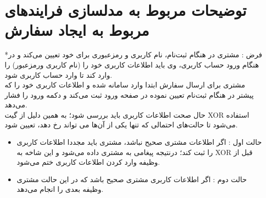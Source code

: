\documentclass[14pt]{article}
\begin{document}
 
\section{ توضيحات مربوط به مدلسازی فرایندهای مربوط به ایجاد سفارش}




*فرض : مشتری در هنگام ثبت‌نام، نام کاربری و رمزعبوری برای خود تعیین می‌کند و در هنگام ورود حساب کاربری، وی باید اطلاعات کاربری خود را (نام کاربری ورمزعبور) را وارد کند تا وارد حساب کاربری شود.\\

مشتری برای ارسال سفارش ابتدا وارد سامانه شده و اطلاعات کاربری خود را که پیشتر در هنگام ثبت‌نام تعیین نموده  در صفحه ورود ثبت می‌کند و دکمه ورود را فشار می‌دهد. \\
حال صحت اطلاعات کاربری باید بررسی شود؛ به همین دلیل از گیت    
XOR  استفاده می‌شود تا حالت‌های احتمالی که تنها یکی از آن‌ها می تواند رخ دهد، تعیین شود.\\
\begin{flushright}
\begin{itemize}
\item حالت اول : اگر اطلاعات مشتری صحیح نباشد، مشتری باید مجددا اطلاعات کاربری را ثبت کند؛ درنتیجه پیغامی به مشتری داده می‌شود و این شاخه به XOR قبل از وظیفه وارد کردن اطلاعات کاربری ختم می‌شود.\\
\item حالت دوم : اگر اطلاعات کاربری مشتری صحیح باشد که در این حالت مشتری وظیفه بعدی را انجام می‌دهد. \\
\end{itemize}
\end{flushright}
\end{document}
